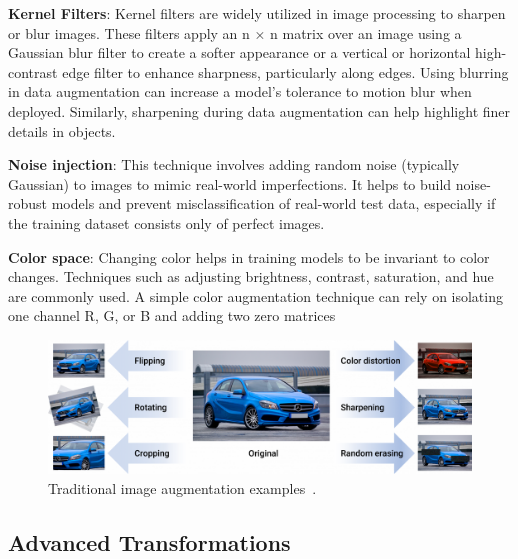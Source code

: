\textbf{Kernel Filters}: Kernel filters are widely utilized in image processing to sharpen or blur images. These filters apply an n × n matrix over an image using a Gaussian blur filter to create a softer appearance or a vertical or horizontal high-contrast edge filter to enhance sharpness, particularly along edges. Using blurring in data augmentation can increase a model's tolerance to motion blur when deployed. Similarly, sharpening during data augmentation can help highlight finer details in objects.

\textbf{Noise injection}: This technique involves adding random noise (typically Gaussian) to images to mimic real-world imperfections. It helps to build noise-robust models and prevent misclassification of real-world test data, especially if the training dataset consists only of perfect images.

\textbf{Color space}: Changing color helps in training models to be invariant to color changes. Techniques such as adjusting brightness, contrast, saturation, and hue are commonly used. A simple color augmentation technique can rely on isolating one channel R, G, or B and adding two zero matrices

\begin{figure}[!htb]
    \centering
    \includegraphics[scale=0.38]{Images/traditional-augmentation-examples.png}
    \caption{Traditional image augmentation examples~\cite{TradAugExamples}.}
    \label{fig:tradAugExamples}
\end{figure}

\subsection{Advanced Transformations}
\label{ssec:advancedTransformations}

